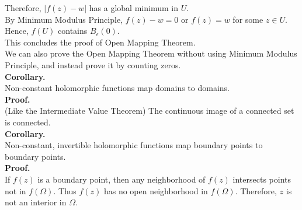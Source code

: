 \documentclass[11pt]{article}
\begin{document}
Therefore, $|f(z) - w|$ has a global minimum in $U$. \\
By Minimum Modulus Principle, $f(z) - w = 0$ or $f(z) = w$ for some $z \in U$. Hence, $f(U)$ contains $B_\epsilon(0)$. \\
This concludes the proof of Open Mapping Theorem. \\
We can also prove the Open Mapping Theorem without using Minimum Modulus Principle, and instead prove it by counting zeros. \\
\newline
\textbf{Corollary.} \\
Non-constant holomorphic functions map domains to domains. \\
\textbf{Proof.} \\
(Like the Intermediate Value Theorem) The continuous image of a connected set is connected. \\
\newline
\textbf{Corollary.} \\
Non-constant, invertible holomorphic functions map boundary points to boundary points. \\
\textbf{Proof.} \\
If $f(z)$ is a boundary point, then any neighborhood of $f(z)$ intersects points not in $f(\Omega)$. Thus $f(z)$ has no open neighborhood in $f(\Omega)$. Therefore, $z$ is not an interior in $\Omega$. 
\end{document}
